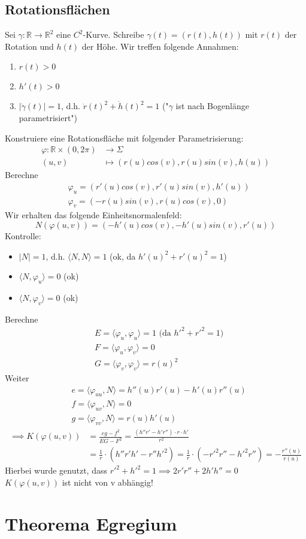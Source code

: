 \documentclass[../main.tex]{subfiles}
\begin{document}
\subsection*{Rotationsflächen}
Sei $\gamma:\mathbb{R}\to\mathbb{R}^{2}$ eine $C^{2}$-Kurve. Schreibe $\gamma(t) = (r(t),h(t))$ mit $r(t)$ der Rotation und $h(t)$ der Höhe. Wir treffen folgende Annahmen:
\begin{enumerate}
    \item $r(t)>0$
    \item $h'(t)>0$
    \item $\lvert\dot{\gamma}(t)\rvert = 1$, d.h. $\dot{r}(t)^{2}+\dot{h}(t)^{2} = 1$ ("$\gamma$ ist nach Bogenlänge parametrisiert")
\end{enumerate}
Konstruiere eine Rotationsfläche mit folgender Parametrisierung:\begin{align*}
    \varphi:\mathbb{R}\times(0,2\pi) &\to \Sigma\\
    (u,v) &\mapsto (r(u)cos(v), r(u)sin(v),h(u))
\end{align*}
Berechne \begin{align*}
    &\varphi_{u} = (r'(u)cos(v), r'(u)sin(v),h'(u))\\
    &\varphi_{v} = (-r(u)sin(v), r(u)cos(v), 0)
\end{align*}
Wir erhalten das folgende Einheitsnormalenfeld:
$$ N(\varphi(u,v)) = (-h'(u)cos(v), -h'(u)sin(v), r'(u))$$
Kontrolle:
\begin{itemize}
    \item $\lvert N\rvert = 1$, d.h. $\langle N,N\rangle = 1$ (ok, da $h'(u)^{2}+r'(u)^{2}=1$)
    \item $\langle N,\varphi_{u}\rangle = 0$ (ok)
    \item $\langle N,\varphi_{v}\rangle = 0$ (ok)
\end{itemize}
Berechne \begin{align*}
    &E = \langle\varphi_{u},\varphi_{u}\rangle = 1 \text{ (da } h'^{2}+r'^{2}=1)\\
    &F = \langle\varphi_{u},\varphi_{v}\rangle = 0\\
    &G = \langle\varphi_{v},\varphi_{v}\rangle = r(u)^{2}
\end{align*}
Weiter \begin{align*}
    &e = \langle\varphi_{uu},N\rangle = h''(u)r'(u)-h'(u)r''(u)\\
    &f = \langle\varphi_{uv},N\rangle = 0\\
    &g = \langle\varphi_{vv},N\rangle = r(u)h'(u)
\end{align*}
\begin{align*}
    \implies K(\varphi(u,v)) &= \frac{eg-f^{2}}{EG-F^{2}} = \frac{(h''r'-h'r'')\cdot r\cdot h'}{r^{2}}\\
    &= \frac{1}{r}\cdot (h''r'h'-r''h'^{2}) = \frac{1}{r}\cdot (-r'^{2}r''-h'^{2}r'') = -\frac{r''(u)}{r(u)}
\end{align*}
Hierbei wurde genutzt, dass $r'^{2} + h'^{2} = 1 \implies 2r'r'' + 2h'h'' = 0$\\
$K(\varphi(u,v))$ ist nicht von v abhängig!



\section{Theorema Egregium}
\end{document}
